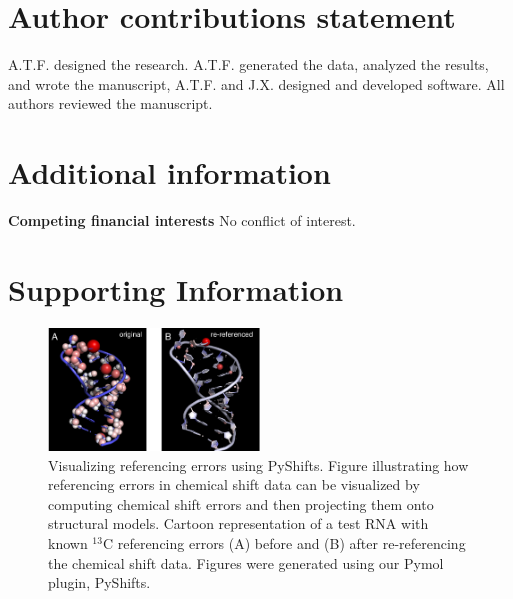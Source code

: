 \documentclass[fleqn,10pt]{wlscirep}
\begin{document}

\section*{Author contributions statement}
A.T.F. designed the research. A.T.F. generated the data, analyzed the results, and wrote the manuscript, A.T.F. and J.X. designed and developed software. All authors reviewed the manuscript. 

\section*{Additional information}
\textbf{Competing financial interests} No conflict of interest. 

\clearpage
\section{Supporting Information}
\renewcommand\thefigure{S\arabic{figure}}    
\setcounter{figure}{0}   

\begin{figure}[h]
\begin{center}
\includegraphics[width=0.5\textwidth]{figure_supplement_referencing}
\end{center}
\caption{ Visualizing referencing errors using PyShifts. Figure illustrating how referencing errors in chemical shift data can be visualized by computing chemical shift errors and then projecting them onto structural models. Cartoon representation of a test RNA with known $^{13}$C referencing errors (A) before and (B) after re-referencing the chemical shift data. Figures were generated using our Pymol plugin, PyShifts.}
\label{fig:ref_errors}
\end{figure}
\end{document}
